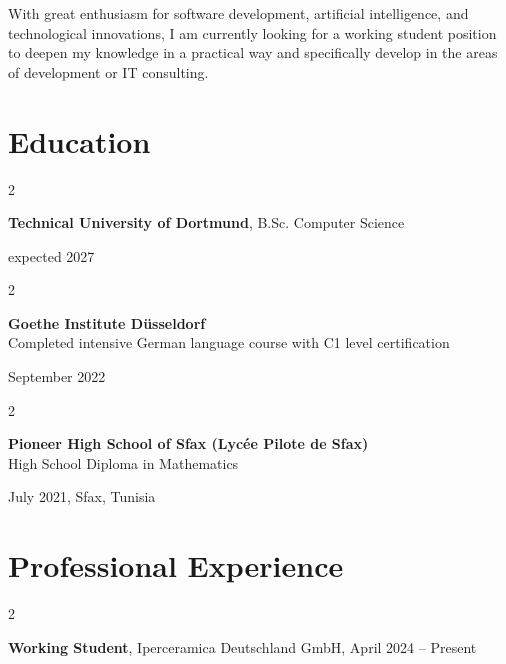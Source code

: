 \documentclass[10pt, letterpaper]{article}
\newenvironment{twocolentry}[2][]{
    \onecolentry
    \def\secondColumn{#2}
    \setcolumnwidth{\fill, 4.5 cm}
    \begin{paracol}{2}
}{
    \switchcolumn \raggedleft \secondColumn
    \end{paracol}
    \endonecolentry
} %
\begin{document}
With great enthusiasm for software development, artificial intelligence, and technological innovations, I am currently looking for a working student position to deepen my knowledge in a practical way and specifically develop in the areas of development or IT consulting.

\section{Education}

\begin{twocolentry}{
      expected 2027
}
    \textbf{Technical University of Dortmund}, B.Sc. Computer Science

    \vspace{0.10 cm}
   
        
       \end{twocolentry}
             
             
\vspace{0.2 cm}
\begin{twocolentry}{
    September 2022
}
    \textbf{Goethe Institute Düsseldorf} \\
   Completed intensive German language course with C1 level certification 
\end{twocolentry}
\vspace{0.2cm}

\begin{twocolentry}{
    July 2021, Sfax, Tunisia}

    \textbf{Pioneer High School of Sfax (Lycée Pilote de Sfax)}\\

   
     
             High School Diploma in Mathematics 


\end{twocolentry}

    
    \section{Professional Experience}
        
        \begin{twocolentry}{
            April 2024 – Present 
        }
            \textbf{Working Student}, Iperceramica Deutschland GmbH, \end{twocolentry}
\end{document}
